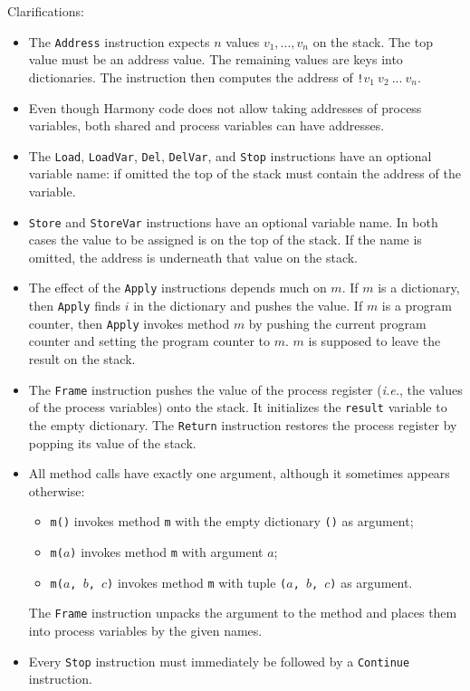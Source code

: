 \documentclass{report}
\begin{document}
\newpage
Clarifications:
\begin{itemize}
\item The \texttt{Address} instruction expects $n$ values $v_1, ..., v_n$ on the stack.
The top value must be an address value.  The remaining values are keys into dictionaries.
The instruction then computes the address of \texttt{!}$v_1~v_2~...~v_n$.
\item Even though Harmony code does not allow taking addresses of process variables, both
shared and process variables can have addresses.
\item The \texttt{Load}, \texttt{LoadVar}, \texttt{Del}, \texttt{DelVar},
and \texttt{Stop} instructions have an optional
variable name: if omitted the top of the stack must contain the address of
the variable.
\item \texttt{Store} and \texttt{StoreVar} instructions have an optional
variable name.  In both cases the value to be assigned is on the top
of the stack.  If the name is omitted, the address is underneath that
value on the stack.
\item The effect of the \texttt{Apply} instructions depends much on $m$.
If $m$ is a dictionary, then \texttt{Apply} finds $i$ in the dictionary
and pushes the value.
If $m$ is a program counter, then \texttt{Apply} invokes method $m$ by
pushing the current program counter and setting the program counter to
$m$.  $m$ is supposed to leave the result on the stack.
\item The \texttt{Frame} instruction pushes the value of the process
register (\emph{i.e.}, the values of the process variables) onto the
stack.  It initializes the \texttt{result} variable to the empty dictionary.
The \texttt{Return} instruction restores the process register by popping
its value of the stack.
\item All method calls have exactly one argument, although it sometimes
appears otherwise:
\begin{itemize}
\item \texttt{m()} invokes method \texttt{m} with the empty dictionary \texttt{()} as argument;
\item \texttt{m($a$)} invokes method \texttt{m} with argument $a$;
\item \texttt{m($a$, $b$, $c$)} invokes method \texttt{m} with tuple \texttt{($a$, $b$, $c$)} as argument.
\end{itemize}
The \texttt{Frame} instruction unpacks the argument to the method and places them into process variables by the given names.
\item Every \texttt{Stop} instruction must immediately be followed by a 
\texttt{Continue} instruction.
\end{itemize}
\end{document}

